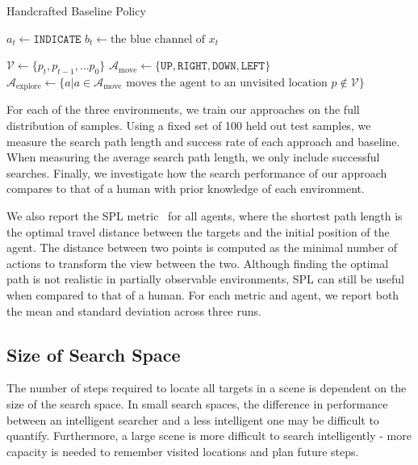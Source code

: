 \begin{algorithm}
    \caption{Handcrafted Baseline Policy}
    \label{alg:handcrafted}
    \begin{algorithmic}
            \State \(a_t \leftarrow \mathtt{INDICATE}\)
        \Else
            \State \(b_t \leftarrow \text{the blue channel of } x_t\)

            \State \(\mathcal{V} \leftarrow \{p_t, p_{t-1}, \dots p_0\}\)
            \State \(\mathcal{A}_{\text{move}} \leftarrow \{\mathtt{UP}, \mathtt{RIGHT}, \mathtt{DOWN}, \mathtt{LEFT}\}\)
            \State \(\mathcal{A}_{\text{explore}} \leftarrow \{a | a \in \mathcal{A}_{\text{move}} \text{ moves the agent to an unvisited location } p \notin \mathcal{V}\}\) 
        \EndIf
    \end{algorithmic}
\end{algorithm}

For each of the three environments, we train our approaches on the full distribution of samples.
Using a fixed set of 100 held out test samples, we measure the search path length and success rate of each approach and baseline.
When measuring the average search path length, we only include successful searches.
Finally, we investigate how the search performance of our approach compares to that of a human with prior knowledge of each environment.

We also report the SPL metric~\cite{anderson_evaluation_2018} for all agents, where the shortest path length is the optimal travel distance between the targets and the initial position of the agent.
The distance between two points is computed as the minimal number of actions to transform the view between the two.
Although finding the optimal path is not realistic in partially observable environments, SPL can still be useful when compared to that of a human.
For each metric and agent, we report both the mean and standard deviation across three runs.

\subsection{Size of Search Space}

The number of steps required to locate all targets in a scene is dependent on the size of the search space.
In small search spaces, the difference in performance between an intelligent searcher and a less intelligent one may be difficult to quantify.
Furthermore, a large scene is more difficult to search intelligently - more capacity is needed to remember visited locations and plan future steps.

